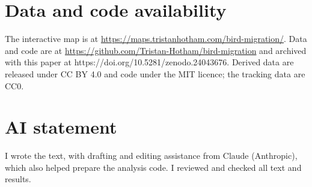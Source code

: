 \documentclass[11pt,a4paper]{article}
\begin{document}
\section*{Data and code availability}
The interactive map is at \url{https://maps.tristanhotham.com/bird-migration/}. Data and code are at \url{https://github.com/Tristan-Hotham/bird-migration} and archived with this paper at https://doi.org/10.5281/zenodo.24043676. Derived data are released under CC BY 4.0 and code under the MIT licence; the tracking data are CC0.

\section*{AI statement}
I wrote the text, with drafting and editing assistance from Claude (Anthropic), which also helped prepare the analysis code. I reviewed and checked all text and results.
\end{document}
